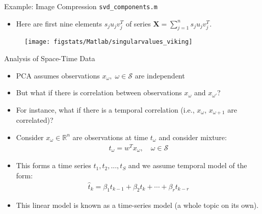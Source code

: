 \documentclass[9pt]{beamer}
\begin{document}
\begin{frame}{Example: Image Compression \footnotesize{\texttt{svd\_components.m}}}

\begin{itemize}
\item Here are first nine elements $s_ju_jv_j^T$ of series $\mathbf{X}=\sum_{j=1}^ns_ju_jv_j^T$. 
\end{itemize}

\begin{figure}[!htb]
    \centering
	\texttt{[image: figstats/Matlab/singularvalues\_viking]}
\end{figure}


\end{frame}

%
\begin{frame}{Analysis of Space-Time Data}

\begin{block}{}
\begin{itemize}
\setlength{\itemsep}{5pt}
\item PCA assumes observations $x_\omega,\; \omega \in \mathcal{S}$ are independent
\item But what if there is correlation between observations $x_\omega$ and $x_{\omega'}$?
\item For instance, what if there is a temporal correlation (i.e., $x_\omega$, $x_{\omega+1}$ are correlated)? 
\end{itemize}
\end{block}

\begin{itemize}
\item Consider $x_\omega\in \mathbb{R}^n$ are observations at time $t_\omega$ and consider mixture:
\begin{align*}
t_\omega=w^Tx_\omega,\quad \omega \in \mathcal{S}
\end{align*}
\item This forms a time series $t_1,t_2,...,t_S$ and we assume temporal model of the form:
\begin{align*}
\hat{t}_k=\beta_1t_{k-1}+\beta_2t_{k}+\cdots+\beta_rt_{k-r}
\end{align*}
\item This linear model is known as a time-series model (a whole topic on its own).
\end{itemize}


\end{frame}
\end{document}
